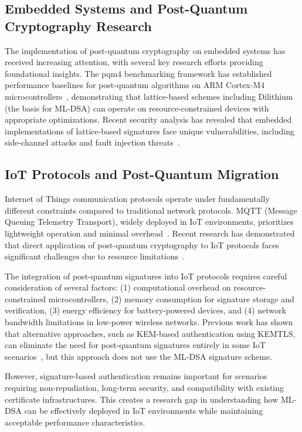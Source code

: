 \documentclass[journal=tches,final]{iacrtrans}
\begin{document}
\subsection{Embedded Systems and Post-Quantum Cryptography Research}

The implementation of post-quantum cryptography on embedded systems has received increasing attention, with several key research efforts providing foundational insights. The pqm4 benchmarking framework has established performance baselines for post-quantum algorithms on ARM Cortex-M4 microcontrollers~\cite{pqm4-benchmarks}, demonstrating that lattice-based schemes including Dilithium (the basis for ML-DSA) can operate on resource-constrained devices with appropriate optimizations.
Recent security analysis has revealed that embedded implementations of lattice-based signatures face unique vulnerabilities, including side-channel attacks and fault injection threats~\cite{SCA-Dilithium}. 

\subsection{IoT Protocols and Post-Quantum Migration}

Internet of Things communication protocols operate under fundamentally different constraints compared to traditional network protocols. MQTT (Message Queuing Telemetry Transport), widely deployed in IoT environments, prioritizes lightweight operation and minimal overhead~\cite{MQTT-Spec}. Recent research has demonstrated that direct application of post-quantum cryptography to IoT protocols faces significant challenges due to resource limitations~\cite{KEM-MQTT2025}.

The integration of post-quantum signatures into IoT protocols requires careful consideration of several factors: (1) computational overhead on resource-constrained microcontrollers, (2) memory consumption for signature storage and verification, (3) energy efficiency for battery-powered devices, and (4) network bandwidth limitations in low-power wireless networks. Previous work has shown that alternative approaches, such as KEM-based authentication using KEMTLS, can eliminate the need for post-quantum signatures entirely in some IoT scenarios~\cite{KEM-MQTT2025}, but this approach does not use the ML-DSA signature scheme.

However, signature-based authentication remains important for scenarios requiring non-repudiation, long-term security, and compatibility with existing certificate infrastructures. This creates a research gap in understanding how ML-DSA can be effectively deployed in IoT environments while maintaining acceptable performance characteristics.
\end{document}
